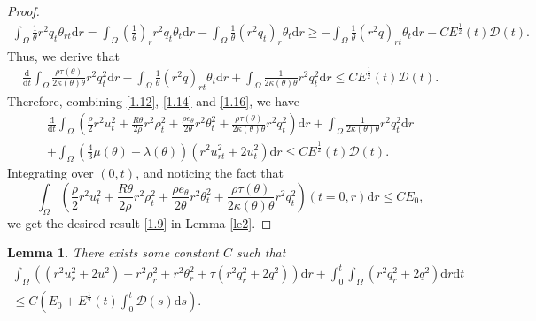 \documentclass[11pt,reqno]{amsart}
\numberwithin{equation}{section}
\newtheorem{lemma}[theorem]{Lemma}
\newcommand{\dif}{\mathrm{d}}
\begin{document}
\begin{proof}
\begin{align*}
 \int_{\Omega} \frac{1}{\theta} r^2 q_t \theta_{rt} \dif r =\int_{\Omega} \left(\frac{1}{\theta}\right)_r r^2 q_t \theta_t \dif r-\int_{\Omega} \frac{1}{\theta} (r^2 q_t)_r \theta_t \dif r \ge -\int_{\Omega} \frac{1}{\theta} (r^2 q)_{rt} \theta_t \dif r -CE^\frac{1}{2}(t) \mathcal D(t).
 \end{align*}
 Thus, we derive that
 \begin{align} \label{1.16}
 \frac{\dif}{\dif t} \int_{\Omega} \frac{\rho \tau(\theta) }{2\kappa(\theta) \theta}   r^2 q_t^2 \dif r -\int_{\Omega} \frac{1}{\theta} (r^2 q)_{rt} \theta_t \dif r +\int_{\Omega} \frac{1}{2\kappa(\theta)\theta} r^2 q_t^2 \dif r \le CE^\frac{1}{2}(t) \mathcal D(t).
 \end{align}
 Therefore, combining \eqref{1.12}, \eqref{1.14} and \eqref{1.16}, we have
 \begin{align}\label{1.17}
 \frac{\dif }{\dif t} \int_{\Omega} \left( \frac{\rho}{2}  r^2 u_t^2+\frac{R\theta}{2\rho} r^2 \rho_t^2+\frac{\rho e_\theta}{2\theta} r^2 \theta_t^2 +\frac{\rho\tau(\theta)}{2\kappa(\theta)\theta} r^2 q_t^2 \right) \dif r
 +\int_{\Omega} \frac{1}{2\kappa(\theta) \theta} r^2 q_t^2 \dif r
 \nonumber\\
+\int_{\Omega}  (\frac{4}{3} \mu(\theta)+\lambda(\theta))(r^2 u_{rt}^2+2u_t^2)\dif r
 \le CE^\frac{1}{2}(t) \mathcal D(t).
 \end{align}
Integrating over $(0,t)$,  and noticing the fact that
 \[
 \int_{\Omega} \left( \frac{\rho}{2}  r^2 u_t^2+\frac{R\theta}{2\rho} r^2 \rho_t^2+\frac{\rho e_\theta}{2\theta} r^2 \theta_t^2 +\frac{\rho\tau(\theta)}{2\kappa(\theta)\theta} r^2 q_t^2 \right) (t=0,r)\dif r\le   CE_0,
 \]
 we get the desired result \eqref{1.9} in Lemma \ref{le2}.
 \end{proof}



\begin{lemma}\label{le3}
There exists some constant $C$ such that
\begin{align}\label{1.18}
 \int_{\Omega} \left( \left(r^2 u_r^2+2u^2\right)+r^2 \rho_r^2+r^2 \theta_r^2+\tau (r^2 q_r^2+2q^2) \right)  \dif r +\int_0^t \int_{\Omega} (r^2 q_r^2+2q^2) \dif r \dif t  \nonumber\\
  \le C(E_0+ E^\frac{1}{2}(t) \int_0^t \mathcal D(s)\dif s ).
\end{align}
\end{lemma}
\end{document}
